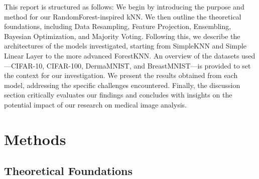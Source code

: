 \documentclass[a4paper]{article}
\begin{document}
This report is structured as follows: We begin by introducing the purpose and method for our RandomForest-inspired kNN. We then outline the theoretical foundations, including Data Resampling, Feature Projection, Ensembling, Bayesian Optimization, and Majority Voting. Following this, we describe the architectures of the models investigated, starting from SimpleKNN and Simple Linear Layer to the more advanced ForestKNN. An overview of the datasets used—CIFAR-10, CIFAR-100, DermaMNIST, and BreastMNIST—is provided to set the context for our investigation. We present the results obtained from each model, addressing the specific challenges encountered. Finally, the discussion section critically evaluates our findings and concludes with insights on the potential impact of our research on medical image analysis.

\section{Methods}\label{methods}
\subsection{Theoretical Foundations}
\end{document}
